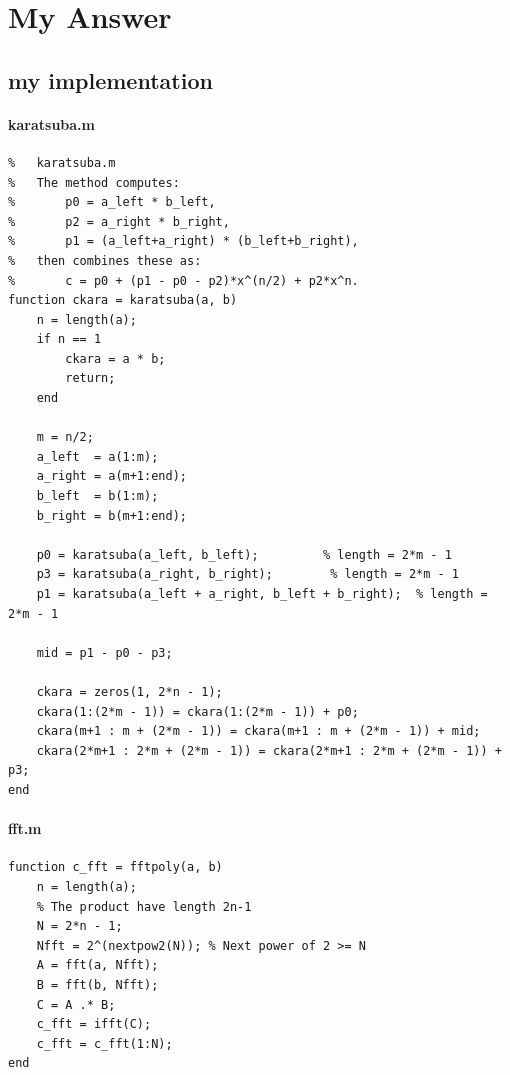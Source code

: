 \documentclass[lang=cn,11pt]{elegantbook}
\begin{document}
\section*{My Answer}
\subsection*{my implementation}
\paragraph*{karatsuba.m}
\begin{lstlisting}
%   karatsuba.m
%   The method computes:
%       p0 = a_left * b_left,
%       p2 = a_right * b_right,
%       p1 = (a_left+a_right) * (b_left+b_right),
%   then combines these as:
%       c = p0 + (p1 - p0 - p2)*x^(n/2) + p2*x^n.
function ckara = karatsuba(a, b)
    n = length(a);
    if n == 1
        ckara = a * b;
        return;
    end
    
    m = n/2;
    a_left  = a(1:m);
    a_right = a(m+1:end);
    b_left  = b(1:m);
    b_right = b(m+1:end);
    
    p0 = karatsuba(a_left, b_left);         % length = 2*m - 1
    p3 = karatsuba(a_right, b_right);        % length = 2*m - 1
    p1 = karatsuba(a_left + a_right, b_left + b_right);  % length = 2*m - 1
    
    mid = p1 - p0 - p3;
    
    ckara = zeros(1, 2*n - 1);
    ckara(1:(2*m - 1)) = ckara(1:(2*m - 1)) + p0;
    ckara(m+1 : m + (2*m - 1)) = ckara(m+1 : m + (2*m - 1)) + mid;
    ckara(2*m+1 : 2*m + (2*m - 1)) = ckara(2*m+1 : 2*m + (2*m - 1)) + p3;
end
\end{lstlisting}

\paragraph*{fft.m}
\begin{lstlisting}
function c_fft = fftpoly(a, b)
    n = length(a);
    % The product have length 2n-1
    N = 2*n - 1;
    Nfft = 2^(nextpow2(N)); % Next power of 2 >= N
    A = fft(a, Nfft);
    B = fft(b, Nfft);
    C = A .* B;
    c_fft = ifft(C);
    c_fft = c_fft(1:N);
end
\end{lstlisting}
\end{document}
